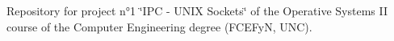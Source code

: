 Repository for project n°1 \char`\"{}\+I\+P\+C -\/ U\+N\+I\+X Sockets\char`\"{} of the Operative Systems II course of the Computer Engineering degree (F\+C\+E\+FyN, U\+NC). 